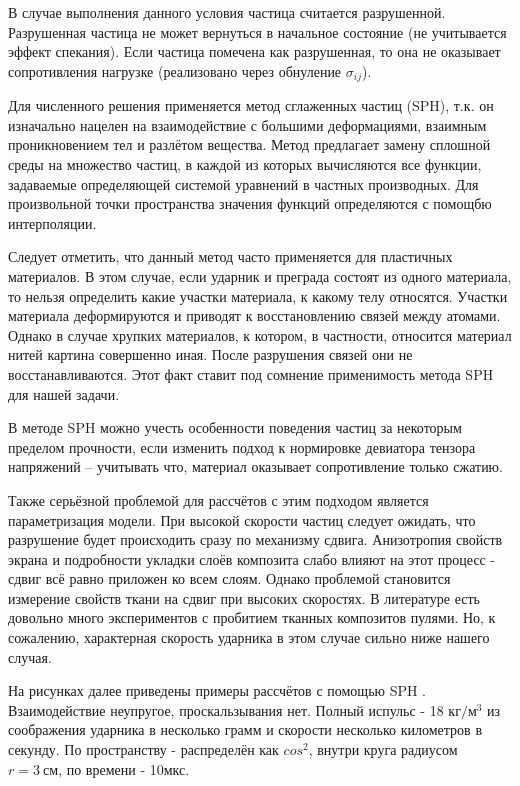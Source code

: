 В случае выполнения данного условия частица считается разрушенной.
Разрушенная частица не может вернуться в начальное состояние (не учитывается эффект спекания).
Если частица помечена как разрушенная, то она не оказывает сопротивления нагрузке (реализовано через обнуление $\sigma_{i j}$).

Для численного решения применяется метод сглаженных частиц (SPH)\cite{monaghanSPH}, т.к. он изначально нацелен на взаимодействие
с большими деформациями, взаимным проникновением тел и разлётом вещества.
Метод предлагает замену сплошной среды на множество частиц, в каждой из которых вычисляются все функции, задаваемые
определяющей системой уравнений в частных производных.
Для произвольной точки пространства значения функций определяются с помощбю интерполяции.

Следует отметить, что данный метод часто применяется для пластичных материалов.
В этом случае, если ударник и преграда состоят из одного материала, то нельзя определить какие участки материала,
к какому телу относятся.
Участки материала деформируются и приводят к восстановлению связей между атомами.
Однако в случае хрупких материалов, к котором, в частности, относится материал нитей картина совершенно иная.
После разрушения связей они не восстанавливаются.
Этот факт ставит под сомнение применимость метода SPH для нашей задачи\cite{bkhatnagar}.

В методе SPH можно учесть особенности поведения частиц за некоторым пределом прочности, если изменить подход
к нормировке девиатора тензора напряжений -- учитывать что, материал оказывает сопротивление только сжатию.

Также серьёзной проблемой для рассчётов с этим подходом является параметризация модели.
При высокой скорости частиц следует ожидать, что разрушение будет происходить сразу по механизму сдвига.
Анизотропия свойств экрана и подробности укладки слоёв композита слабо влияют на этот процесс - сдвиг всё равно
приложен ко всем слоям.
Однако проблемой становится измерение свойств ткани на сдвиг при высоких скоростях.
В литературе есть довольно много экспериментов с пробитием тканных композитов пулями.
Но, к сожалению, характерная скорость ударника в этом случае сильно ниже нашего случая.

На рисунках далее приведены примеры рассчётов с помощью SPH .
Взаимодействие неупругое, проскальзывания нет.
Полный испульс - 18 $кг/м^3$ из соображения ударника в несколько грамм и скорости несколько километров в секунду.
По пространству - распределён как $cos^2$, внутри круга радиусом $r = 3~см$, по времени - 10мкс.

